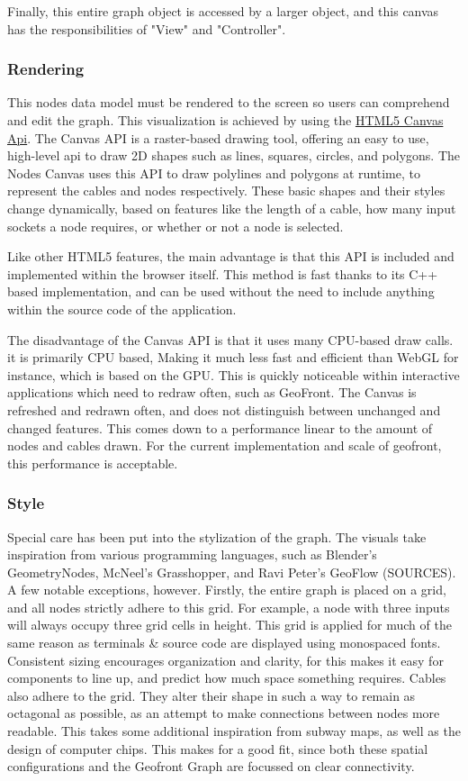 Finally, this entire graph object is accessed by a larger  object, and this canvas has the responsibilities of "View" and "Controller". 

\subsubsection*{ Rendering }
This nodes data model must be rendered to the screen so users can comprehend and edit the graph. 
This visualization is achieved by using the \href{https://developer.mozilla.org/en-US/docs/Web/API/Canvas_API}{HTML5 Canvas Api}. 
The Canvas API is a raster-based drawing tool, offering an easy to use, high-level api to draw 2D shapes such as lines, squares, circles, and polygons. 
The Nodes Canvas uses this API to draw polylines and polygons at runtime, to represent the cables and nodes respectively. 
These basic shapes and their styles change dynamically, based on features like the length of a cable, how many input sockets a node requires, or whether or not a node is selected. 

Like other HTML5 features, the main advantage is that this API is included and implemented within the browser itself. This method is fast thanks to its C++ based implementation, and can be used without the need to include anything within the source code of the application.

The disadvantage of the Canvas API is that it uses many CPU-based draw calls. it is primarily CPU based, Making it much less fast and efficient than WebGL for instance, which is based on the GPU. 
This is quickly noticeable within interactive applications which need to redraw often, such as GeoFront. 
The Canvas is refreshed and redrawn often, and does not distinguish between unchanged and changed features. 
This comes down to a performance linear to the amount of nodes and cables drawn. For the current implementation and scale of geofront, this performance is acceptable. 

\subsubsection*{ Style }
Special care has been put into the stylization of the graph.
The visuals take inspiration from various programming languages, such as Blender's GeometryNodes, McNeel's Grasshopper, and Ravi Peter's GeoFlow (SOURCES). 
A few notable exceptions, however. 
Firstly, the entire graph is placed on a grid, and all nodes strictly adhere to this grid. 
For example, a node with three inputs will always occupy three grid cells in height. 
This grid is applied for much of the same reason as terminals \& source code are displayed using monospaced fonts. 
Consistent sizing encourages organization and clarity, for this makes it easy for components to line up, and predict how much space something requires.  
Cables also adhere to the grid. They alter their shape in such a way to remain as octagonal as possible, as an attempt to make connections between nodes more readable.
This takes some additional inspiration from subway maps, as well as the design of computer chips. This makes for a good fit, since both these spatial configurations and the Geofront Graph are focussed on clear connectivity.

